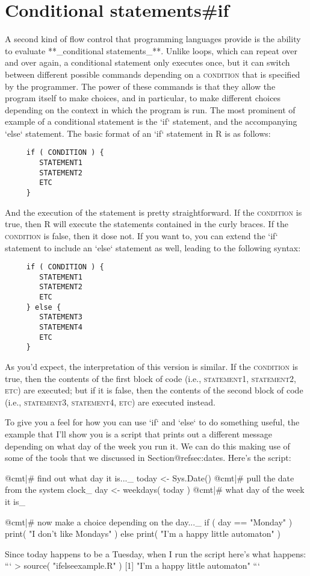 \section{Conditional statements{#if}}

A second kind of flow control that programming languages provide is the ability to evaluate **_conditional statements_**. Unlike loops, which can repeat over and over again, a conditional statement only executes once, but it can switch between different possible commands depending on a \textsc{condition} that is specified by the programmer. The power of these commands is that they allow the program itself to make choices, and in particular, to make different choices depending on the context in which the program is run. The most prominent of example of a conditional statement is the `if` statement, and the accompanying `else` statement. The basic format of an `if` statement in R is as follows:
\begin{verbatim}
     if ( CONDITION ) {
        STATEMENT1
        STATEMENT2
        ETC
     }
\end{verbatim}
And the execution of the statement is pretty straightforward. If the \textsc{condition} is true, then R will execute the statements contained in the curly braces. If the \textsc{condition} is false, then it dose not. If you want to, you can extend the `if` statement to include an `else` statement as well, leading to the following syntax:
\begin{verbatim}
     if ( CONDITION ) {
        STATEMENT1
        STATEMENT2
        ETC
     } else {
        STATEMENT3
        STATEMENT4
        ETC
     }     
\end{verbatim}
As you'd expect, the interpretation of this version is similar. If the \textsc{condition} is true, then the contents of the first block of code (i.e., \textsc{statement1}, \textsc{statement2}, \textsc{etc}) are executed; but if it is false, then the contents of the second block of code (i.e., \textsc{statement3}, \textsc{statement4}, \textsc{etc}) are executed instead. 

To give you a feel for how you can use `if` and `else` to do something useful, the example that I'll show you is a script that prints out a different message depending on what day of the week you run it. We can do this making use of some of the tools that we discussed in Section@refsec:dates. Here's the script:

\begin{script}
@cmt|# find out what day it is..._
today <- Sys.Date()       @cmt|# pull the date from the system clock_
day <- weekdays( today )  @cmt|# what day of the week it is_

@cmt|# now make a choice depending on the day..._
if ( day == "Monday" ) {
  print( "I don't like Mondays" )
} else {
  print( "I'm a happy little automaton" )
}
\end{script}
Since today happens to be a Tuesday, when I run the script here's what happens:
```
> source( "ifelseexample.R" )
[1] "I'm a happy little automaton"
```

